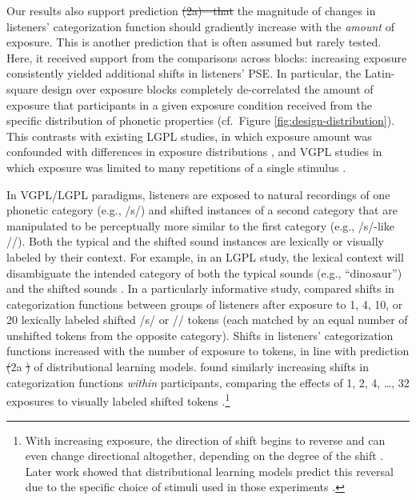 \documentclass[
  11pt,
  man,mask,floatsintext]{apa6}
\makeatletter
\providecommand{\DIFadd}[1]{{\protect\color{blue}\uwave{#1}}} %
\providecommand{\DIFdel}[1]{{\protect\color{red}\sout{#1}}} %
\providecommand{\DIFaddbegin}{} %
\providecommand{\DIFaddend}{} %
\providecommand{\DIFdelbegin}{} %
\providecommand{\DIFdelend}{} %
\newcommand{\DIFscaledelfig}{0.5}
\newlength{\DIFdelgraphicswidth} %
\newlength{\DIFdelgraphicsheight} %
\newcommand{\DIFaddincludegraphics}[2][]{{\color{blue}\fbox{\DIFOincludegraphics[#1]{#2}}}} %
\newcommand{\DIFdelincludegraphics}[2][]{%
\sbox{\DIFdelgraphicsbox}{\DIFOincludegraphics[#1]{#2}}%
\settoboxwidth{\DIFdelgraphicswidth}{\DIFdelgraphicsbox} %
\settoboxtotalheight{\DIFdelgraphicsheight}{\DIFdelgraphicsbox} %
\scalebox{\DIFscaledelfig}{%
\parbox[b]{\DIFdelgraphicswidth}{\usebox{\DIFdelgraphicsbox}\\[-\baselineskip] \rule{\DIFdelgraphicswidth}{0em}}\llap{\resizebox{\DIFdelgraphicswidth}{\DIFdelgraphicsheight}{%
\setlength{\unitlength}{\DIFdelgraphicswidth}%
\begin{picture}(1,1)%
\thicklines\linethickness{2pt} %
{\color[rgb]{1,0,0}\put(0,0){\framebox(1,1){}}}%
{\color[rgb]{1,0,0}\put(0,0){\line( 1,1){1}}}%
{\color[rgb]{1,0,0}\put(0,1){\line(1,-1){1}}}%
\end{picture}%
}\hspace*{3pt}}} %
} %
\DeclareRobustCommand{\DIFaddbegin}{\DIFOaddbegin \let\includegraphics\DIFaddincludegraphics} %
\DeclareRobustCommand{\DIFaddend}{\DIFOaddend \let\includegraphics\DIFOincludegraphics} %
\DeclareRobustCommand{\DIFdelbegin}{\DIFOdelbegin \let\includegraphics\DIFdelincludegraphics} %
\DeclareRobustCommand{\DIFdelend}{\DIFOaddend \let\includegraphics\DIFOincludegraphics} %
\let\sout@orig\sout %
\renewcommand{\sout}[1]{\ifmmode\text{\sout@orig{\ensuremath{#1}}}\else\sout@orig{#1}\fi} %
\makeatother
\begin{document}
Our results also support prediction \DIFdelbegin \DIFdel{(2a)---that }\DIFdelend \DIFaddbegin \DIFadd{2a---that }\DIFaddend the magnitude of changes in listeners' categorization function should gradiently increase with the \emph{amount} of exposure. This is another prediction that is often assumed but rarely tested. Here, it received support from the comparisons across blocks: increasing exposure consistently yielded additional shifts in listeners' PSE. In particular, the Latin-square design over exposure blocks completely de-correlated the amount of exposure that participants in a given exposure condition received from the specific distribution of phonetic properties (cf.~Figure \ref{fig:design-distribution}). This contrasts with existing LGPL studies, in which exposure amount was confounded with differences in exposure distributions \autocite{cummings-theodore2023,liu-jaeger2018,liu-jaeger2019}, and VGPL studies in which exposure was limited to many repetitions of a single stimulus \autocites[e.g.,][]{kleinschmidt-jaeger2012,vroomen2007}.

In VGPL/LGPL paradigms, listeners are exposed to natural recordings of one phonetic category (e.g., /s/) and shifted instances of a second category that are manipulated to be perceptually more similar to the first category (e.g., /s/-like //). Both the typical and the shifted sound instances are lexically or visually labeled by their context. For example, in an LGPL study, the lexical context will disambiguate the intended category of both the typical sounds (e.g., ``dino\emph{s}aur'') and the shifted sounds \autocites[e.g., ``medi\emph{sh}ine'',][]{norris2003,eisner-mcqueen2005,kraljic-samuel2005}.
In a particularly informative study, \textcite{cummings-theodore2023} compared shifts in categorization functions between groups of listeners after exposure to 1, 4, 10, or 20 lexically labeled shifted /s/ or // tokens (each matched by an equal number of unshifted tokens from the opposite category). Shifts in listeners' categorization functions increased with the number of exposure to tokens, in line with prediction \DIFdelbegin \DIFdel{(}\DIFdelend 2a \DIFdelbegin \DIFdel{) }\DIFdelend of distributional learning models. \textcite{vroomen2007} found similarly increasing shifts in categorization functions \emph{within} participants, comparing the effects of 1, 2, 4, \ldots, 32 exposures to visually labeled shifted tokens \autocite[see also][]{kleinschmidt-jaeger2012}.\footnote{With increasing exposure, the direction of shift begins to reverse \autocites[returning to baseline after 128-256 exposures,][]{kleinschmidt-jaeger2011,vroomen2007} and can even change directional altogether, depending on the degree of the shift \autocite{kleinschmidt-jaeger2012}. Later work showed that distributional learning models predict this reversal due to the specific choice of stimuli used in those experiments \autocite{kleinschmidt-jaeger2015}.}
\end{document}
